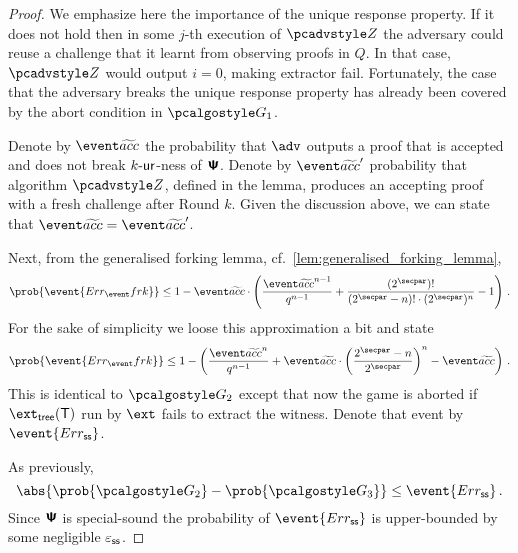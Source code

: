 \documentclass[runningheads,11pt]{llncs}
\theoremstyle{definition} \newtheorem{definition}[theorem]{Definition}
\begin{document}
\begin{proof}
We emphasize here the importance of the unique response property. If it does not
hold then in some $j$-th execution of $\zdv$ the adversary could reuse a
challenge that it learnt from observing proofs in $Q$. In that case, $\zdv$
would output $i = 0$, making extractor fail. Fortunately, the case that the
adversary breaks the unique response property has already been covered by the
abort condition in $\game{1}$.

Denote by $\waccProb$ the probability that $\advse$ outputs a proof that is
accepted and does not break ${k\text{-}\mathsf{ur}}$-ness of $\bm{\mathsf{\Psi}}$.  Denote by $\waccProb'$
probability that algorithm $\zdv$, defined in the lemma, produces an accepting
proof with a fresh challenge after Round $k$. Given the discussion above, we can
state that $\waccProb = \waccProb'$.

Next, from the generalised forking lemma, cf.~\cref{lem:generalised_forking_lemma},
\[
	\prob{\event{\errfrk}} \leq 1 -
	\waccProb \cdot \left(\frac{\waccProb^{n - 1}}{q^{n - 1}} +
	\frac{(2^\secpar) !}{(2^\secpar - n)! \cdot
(2^\secpar)^{n}} - 1\right)\,.
\]
For the sake of simplicity we loose this approximation a bit and state
\[
	\prob{\event{\errfrk}} \leq 1 -
	\left(\frac{\waccProb^{n}}{q^{n - 1}} +
		\waccProb \cdot \left(\frac{2^\secpar - n}{2^\secpar}\right)^{n} -
	\waccProb\right)\,.
\]
 This is identical to $\game{2}$ except that now the game is aborted if
$\extt(\tree)$ run by $\ext$ fails to extract the witness. Denote that event by
$\event{\errss}$.

As previously, 
\[
	\abs{\prob{\game{2}} - \prob{\game{3}}} \leq \event{\errss}\,.
\]
Since $\bm{\mathsf{\Psi}}$ is special-sound the probability of $\event{\errss}$ is
upper-bounded by some negligible $\varepsilon_{\mathsf{ss}}$.


\end{proof}
\end{document}
